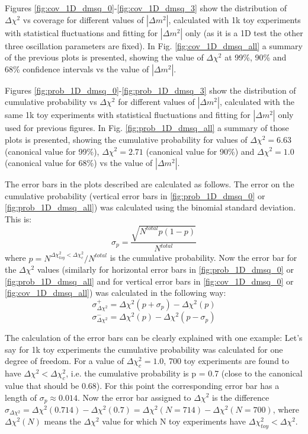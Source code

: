 Figures \ref{fig:cov_1D_dmsq_0}-\ref{fig:cov_1D_dmsq_3} show the distribution of $\Delta\chi^{2}$ vs coverage for different values of $|\Delta m^{2}|$,
calculated with 1k toy experiments with statistical fluctuations and fitting for $|\Delta m^{2}|$ only 
(as it is a 1D test the other three oscillation parameters are fixed). In Fig. \ref{fig:cov_1D_dmsq_all} a summary of the previous plots is presented,
showing the value of $\Delta\chi^{2}$ at 99\%, 90\% and 68\% confidence intervals vs the value of $|\Delta m^{2}|$.

Figures \ref{fig:prob_1D_dmsq_0}-\ref{fig:prob_1D_dmsq_3} show the distribution of cumulative probability vs $\Delta\chi^{2}$ for different values of $|\Delta m^{2}|$,
calculated with the same 1k toy experiments with statistical fluctuations and fitting for $|\Delta m^{2}|$ only used for previous figures.
In Fig. \ref{fig:prob_1D_dmsq_all} a summary of those plots is presented,
showing the cumulative probability for values of $\Delta\chi^{2}=6.63$ (canonical value for 99\%), $\Delta\chi^{2}=2.71$ (canonical value for 90\%) and $\Delta\chi^{2}=1.0$ (canonical value for 68\%)  vs the value of $|\Delta m^{2}|$.

The error bars in the plots described are calculated as follows.
The error on the cumulative probability (vertical error bars in \ref{fig:prob_1D_dmsq_0} or \ref{fig:prob_1D_dmsq_all}) was calculated using the binomial standard deviation. This is:
\begin{equation}
\sigma_{p} = \frac{\sqrt{N^{total}p(1-p)}}{N^{total}}
\end{equation}
where $p = {N^{\Delta\chi^2_{toy}<\Delta\chi^{2}_{c}}}/{N^{total}}$ is the cumulative probability. 
Now the error bar for the $\Delta\chi^{2}$ values (similarly for horizontal error bars in \ref{fig:prob_1D_dmsq_0} or \ref{fig:prob_1D_dmsq_all} and for vertical error bars in \ref{fig:cov_1D_dmsq_0} or \ref{fig:cov_1D_dmsq_all}) was calculated in the following way:
\begin{equation}
\sigma^{+}_{\Delta\chi^{2}} = \Delta\chi^{2}(p+\sigma_{p}) - \Delta\chi^{2}(p)
\end{equation}
\begin{equation}
\sigma^{-}_{\Delta\chi^{2}} =  \Delta\chi^{2}(p) - \Delta\chi^{2}(p-\sigma_{p})
\end{equation}

The calculation of the error bars can be clearly explained with one example:
Let's say for 1k toy experiments the cumulative probability was calculated for one degree of freedom. For a value of $\Delta\chi^{2}_{c}=1.0$, 700 toy experiments are found to have $\Delta\chi^{2} < \Delta\chi^{2}_{c}$, i.e. the cumulative probability is p = 0.7 (close to the canonical value that should be 0.68). For this point the corresponding error bar has a length of $\sigma_{p} \approx 0.014$. Now the error bar assigned to $\Delta\chi^{2}$ is the difference $\sigma_{\Delta\chi^{2}} = \Delta\chi^{2}(0.714) - \Delta\chi^{2}(0.7) = \Delta\chi^{2}(N=714) - \Delta\chi^{2}(N=700)$, 
where $\Delta\chi^{2}(N)$ means the $\Delta\chi^{2}$ value for which N toy experiments have $\Delta\chi^{2}_{toy} < \Delta\chi^{2}$.


